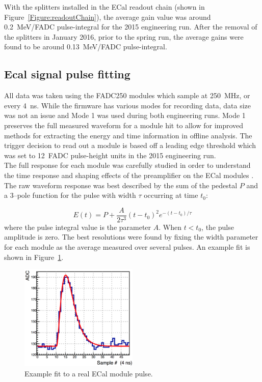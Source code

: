 With the splitters installed in the ECal readout chain (shown in Figure~\ref{Figure:readoutChain}), the average gain value was around 0.2~MeV/FADC pulse-integral for the 2015 engineering run. After the removal of the splitters in January 2016, prior to the spring run, the average gains were found to be around 0.13~MeV/FADC pulse-integral.

\subsection{Ecal signal pulse fitting} \label{pulsefitting}
All data was taken using the FADC250 modules which sample at 250~MHz, or every 4~ns. While the firmware has various modes for recording data, data size was not an issue and Mode 1 was used during both engineering runs. Mode 1 preserves the full measured waveform for a module hit to allow for improved methods for extracting the energy and time information in offline analysis. The trigger decision to read out a module is based off a leading edge threshold which was set to 12~FADC pulse-height units in the 2015 engineering run. \\
\indent The full response for each module was carefully studied in order to understand the time response and shaping effects of the preamplifier on the ECal modules \cite{charles_2014}. The raw waveform response was best described by the sum of the pedestal $P$ and a $3$--pole function for the pulse with width $\tau$ occurring at time $t_0$:

\begin{equation}
	\label{eq:thrpole}
	E(t) = P + \dfrac{A}{2\tau^3}(t-t_0)^2e^{-(t-t_0)/\tau} 
\end{equation}
where the pulse integral value is the parameter $A$. When $t<t_0$, the pulse amplitude is zero. The best resolutions were found by fixing the width parameter for each module as the average measured over several pulses. An example fit is shown in Figure~\ref{Figure:mode1fit}.

\begin{figure}[htb]
  \centering
      \includegraphics[width=0.5\textwidth]{pics/performance/mode1fit.png}
  \caption[Pulse-fitting to Mode 1 ECal data]{Example fit to a real ECal module pulse.}
  \label{Figure:mode1fit}
\end{figure}

